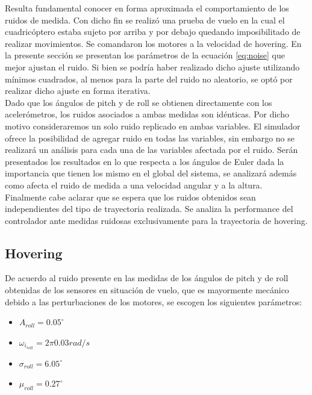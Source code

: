 \documentclass[main]{subfiles}
\begin{document}
Resulta fundamental conocer en forma aproximada el comportamiento de los ruidos de medida. Con dicho fin se realiz\'o una prueba de vuelo en la cual el cuadric\'optero estaba sujeto por arriba y por debajo quedando imposibilitado de realizar movimientos. Se comandaron los motores a la velocidad de hovering. En la presente secci\'on se presentan los par\'ametros de la ecuaci\'on \ref{eq:noise} que mejor ajustan el ruido. Si bien se podr\'ia haber realizado dicho ajuste utilizando m\'inimos cuadrados, al menos para la parte del ruido no aleatorio, se opt\'o por realizar dicho ajuste en forma iterativa.\\

Dado que los \'angulos de pitch y de roll se obtienen directamente con los aceler\'ometros, los ruidos asociados a ambas medidas son id\'enticas. Por dicho motivo consideraremos un solo ruido replicado en ambas variables. El simulador ofrece la posibilidad de agregar ruido en todas las variables, sin embargo no se realizar\'a un an\'alisis para cada una de las variables afectada por el ruido. Ser\'an presentados los resultados en lo que respecta a los \'angulos de Euler dada la importancia que tienen los mismo en el global del sistema, se analizar\'a adem\'as como afecta el ruido de medida a una velocidad angular y a la altura.\\

Finalmente cabe aclarar que se espera que los ruidos obtenidos sean independientes del tipo de trayectoria realizada. Se analiza la performance del controlador ante medidas ruidosas exclusivamente para la trayectoria de hovering.
\subsection{Hovering}

De acuerdo al ruido presente en las medidas de los \'angulos de pitch y de roll obtenidas de los sensores en situaci\'on de vuelo, que es mayormente mec\'anico debido a las perturbaciones de los motores, se escogen los siguientes par\'ametros:

\begin{itemize}
\item $A_{roll} = 0.05^\circ$
\item $\omega_{i_{roll}} = 2\pi 0.03 rad/s$
\item $\sigma_{roll} = 6.05^\circ$
\item $\mu_{roll} = 0.27 ^\circ$
\end{itemize}
\end{document}
